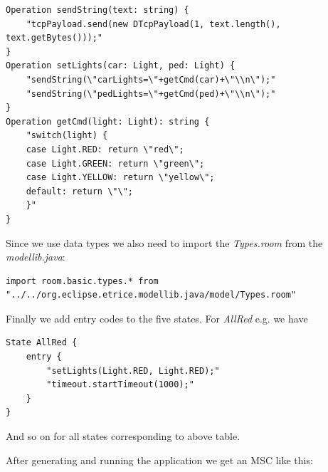 \begin{lstlisting}[language=ROOM]
Operation sendString(text: string) {
	"tcpPayload.send(new DTcpPayload(1, text.length(), text.getBytes()));"
}
Operation setLights(car: Light, ped: Light) {
	"sendString(\"carLights=\"+getCmd(car)+\"\\n\");"
	"sendString(\"pedLights=\"+getCmd(ped)+\"\\n\");"
}
Operation getCmd(light: Light): string {
	"switch(light) {
	case Light.RED: return \"red\";
	case Light.GREEN: return \"green\";
	case Light.YELLOW: return \"yellow\";
	default: return \"\";
	}"
}
\end{lstlisting}

Since we use data types we also need to import the \textit{Types.room} from the \textit{modellib.java}:

\begin{lstlisting}[language=ROOM]
import room.basic.types.* from "../../org.eclipse.etrice.modellib.java/model/Types.room"
\end{lstlisting}

Finally we add entry codes to the five states. For \textit{AllRed} e.g. we have

\begin{lstlisting}[language=ROOM]
State AllRed {
	entry {
		"setLights(Light.RED, Light.RED);"
		"timeout.startTimeout(1000);"
	}
}
\end{lstlisting}

And so on for all states corresponding to above table.

After generating and running the application we get an MSC like this:


